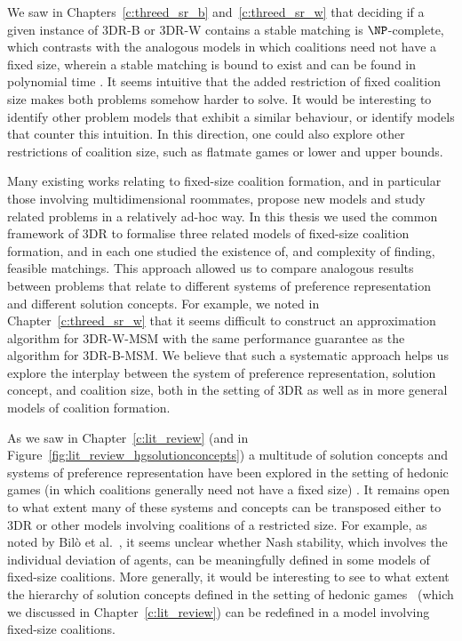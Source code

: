 We saw in Chapters~\ref{c:threed_sr_b} and~\ref{c:threed_sr_w} that deciding if a given instance of 3DR-B or 3DR-W contains a stable matching is $\NP$-complete, which contrasts with the analogous models in which coalitions need not have a fixed size, wherein a stable matching is bound to exist and can be found in polynomial time \cite{CR01,CH04}. It seems intuitive that the added restriction of fixed coalition size makes both problems somehow harder to solve. It would be interesting to identify other problem models that exhibit a similar behaviour, or identify models that counter this intuition. 
In this direction, one could also explore other restrictions of coalition size, such as flatmate games \cite{Brandt2020FindingAR} or lower and upper bounds. 

Many existing works relating to fixed-size coalition formation, and in particular those involving multidimensional roommates, propose new models and study related problems in a relatively ad-hoc way. In this thesis we used the common framework of 3DR to formalise three related models of fixed-size coalition formation, and in each one studied the existence of, and complexity of finding, feasible matchings. This approach allowed us to compare analogous results between problems that relate to different systems of preference representation and different solution concepts. For example, we noted in Chapter~\ref{c:threed_sr_w} that it seems difficult to construct an approximation algorithm for 3DR-W-MSM with the same performance guarantee as the algorithm for 3DR-B-MSM. We believe that such a systematic approach helps us explore the interplay between the system of preference representation, solution concept, and coalition size, both in the setting of 3DR as well as in more general models of coalition formation.

As we saw in Chapter~\ref{c:lit_review} (and in Figure~\ref{fig:lit_review_hgsolutionconcepts}) a multitude of solution concepts and systems of preference representation have been explored in the setting of hedonic games (in which coalitions generally need not have a fixed size) \cite{HedonicGamesHOCSC}. It remains open to what extent many of these systems and concepts can be transposed either to 3DR or other models involving coalitions of a restricted size. For example, as noted by Bil\`o et al.~\cite{Bilo22}, it seems unclear whether Nash stability, which involves the individual deviation of agents, can be meaningfully defined in some models of fixed-size coalitions. More generally, it would be interesting to see to what extent the hierarchy of solution concepts defined in the setting of hedonic games~\cite{HedonicGamesHOCSC,AZIZ2013316,BY19} (which we discussed in Chapter~\ref{c:lit_review}) can be redefined in a model involving fixed-size coalitions. 
